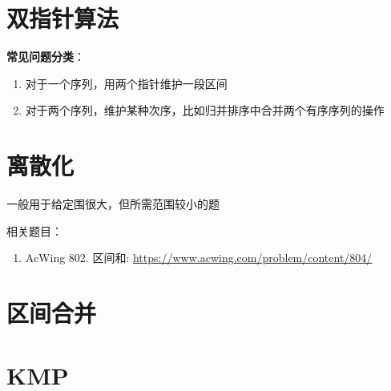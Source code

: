 \section{双指针算法}
\textbf{常见问题分类}：
\begin{enumerate}
    \item 对于一个序列，用两个指针维护一段区间 
    \item 对于两个序列，维护某种次序，比如归并排序中合并两个有序序列的操作  
\end{enumerate}


\section{离散化}
一般用于给定围很大，但所需范围较小的题


\ifshowLink
相关题目：
    \begin{enumerate}
        \item AcWing 802. 区间和: \href{https://www.acwing.com/problem/content/804/}{https://www.acwing.com/problem/content/804/}
    \end{enumerate}
\fi

\section{区间合并}


\section{KMP}
